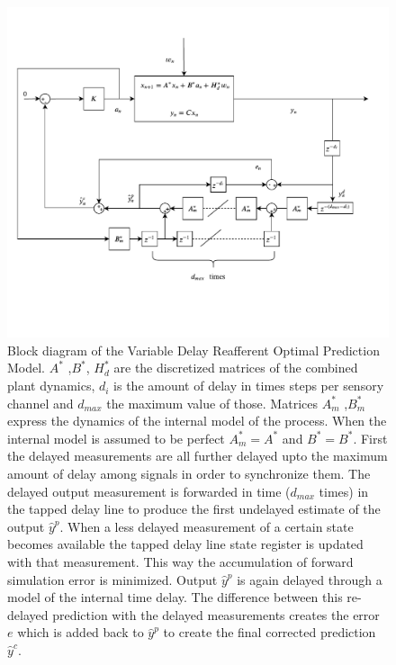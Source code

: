  \begin{figure}[ht]
    \centering

    \includegraphics[width=\linewidth,trim={0 2.8cm 0 2cm},clip]{images/VDROP_block.pdf}
    \caption{Block diagram of the Variable Delay Reafferent Optimal Prediction Model. \ensuremath{A^*} ,\ensuremath{B^*}, \ensuremath{H_d^*} are the discretized matrices of the combined plant dynamics, \ensuremath{d_i} is the amount of delay in times steps per sensory channel and \ensuremath{d_{max}} the maximum value of those. Matrices \ensuremath{A_m^*} ,\ensuremath{B_m^*} express the dynamics of the internal model of the process. When the internal model is assumed to be perfect \ensuremath{A_m^*=A^*} and \ensuremath{B^*=B^*}. First the delayed measurements are all further delayed upto the maximum amount of delay among signals  in order to synchronize them.  The delayed output measurement  is forwarded in time (\ensuremath{d_{max}} times) in the tapped delay line to produce the first undelayed estimate of the output \ensuremath{\hat{y}^p}. When a less delayed measurement  of a certain state becomes available the tapped delay line  state register is updated with that measurement. This way the accumulation of forward simulation error is minimized. Output \ensuremath{\hat{y}^p} is again delayed through a model of the  internal time delay. The difference between this re-delayed prediction with the delayed measurements creates the error \ensuremath{e} which is added back to  \ensuremath{\hat{y}^p}  to create the final corrected prediction \ensuremath{\hat{y}^c}. }
    \label{fig:paper4}
\end{figure}

